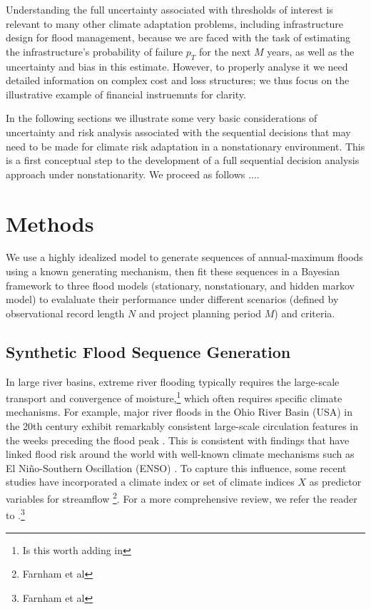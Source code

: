 \documentclass[11pt]{article}
\begin{document}
Understanding the full uncertainty associated with thresholds of interest is relevant to many other climate adaptation problems, including infrastructure design for flood management, because we are faced with the task of estimating the infrastructure's probability of failure \(p_T\) for the next \(M\) years, as well as the uncertainty and bias in this estimate.
However, to properly analyse it we need detailed information on complex cost and loss structures; we thus focus on the illustrative example of financial instruemnts for clarity.

In the following sections we illustrate some very basic considerations of uncertainty and risk analysis associated with the sequential decisions that may need to be made for climate risk adaptation in a nonstationary environment.
This is a first conceptual step to the development of a full sequential decision analysis approach under nonstationarity.
We proceed as follows \( \ldots \).

\section{Methods}\label{sec:methods}

We use a highly idealized model to generate sequences of annual-maximum floods using a known generating mechanism, then fit these sequences in a Bayesian framework to three flood models (stationary, nonstationary, and hidden markov model) to evalaluate their performance under different scenarios (defined by observational record length \(N\) and project planning period \(M\)) and criteria.

\subsection{Synthetic Flood Sequence Generation}

In large river basins, extreme river flooding typically requires the large-scale transport and convergence of moisture,\footnote{Is this worth adding in} which often requires specific climate mechanisms.
For example, major river floods in the Ohio River Basin (USA) in the 20th century exhibit remarkably consistent large-scale circulation features in the weeks preceding the flood peak \citep{Nakamura2012,Robertson2015}.
This is consistent with findings that have linked flood risk around the world with well-known climate mechanisms such as El Ni\~{n}o-Southern Oscillation (ENSO) \citep{Ward2014,Emerton2017}.
To capture this influence, some recent studies have incorporated a climate index or set of climate indices \(X\) as predictor variables for streamflow \citep{Delgado2014,Silva2016,Sun2014,Griffis2007}\footnote{Farnham et al}.
For a more comprehensive review, we refer the reader to \citet{Hall2014}.\footnote{Farnham et al}
\end{document}
